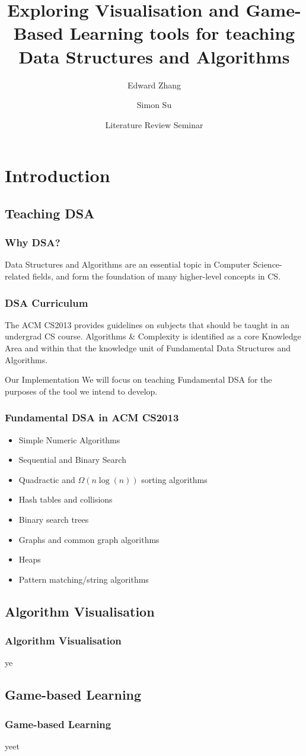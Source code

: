 \documentclass{beamer}
\title[Visualisation and GBL for DSA teaching] %
{Exploring Visualisation and Game-Based Learning tools for teaching Data Structures and Algorithms}
\author{Edward Zhang \and Simon Su}
\institute[UoA] %
{
  Department of ECSE\\
  The University of Auckland
}
\date[May 2019] %
{Literature Review Seminar}
\begin{document}
\frame{\titlepage}
\section{Introduction}
\subsection{Teaching DSA}
\begin{frame}
  \frametitle{Why DSA?}
  Data Structures and Algorithms are an essential topic in Computer Science-related fields, and form the foundation of many higher-level concepts in CS.
\end{frame}
\begin{frame}
  \frametitle{DSA Curriculum}
  The ACM CS2013 provides guidelines on subjects that should be taught in an undergrad CS course. Algorithms \& Complexity is identified as a core Knowledge Area and within that the knowledge unit of Fundamental Data Structures and Algorithms.
  \pause
  \begin{block}{Our Implementation}
  We will focus on teaching Fundamental DSA for the purposes of the tool we intend to develop.
  \end{block}
\end{frame}
\begin{frame}
  \frametitle{Fundamental DSA in ACM CS2013}
  \begin{itemize}
    \item Simple Numeric Algorithms
    \item Sequential and Binary Search
    \item Quadractic and $\Omega(n\log(n))$ sorting algorithms
    \item Hash tables and collisions
    \item Binary search trees
    \item Graphs and common graph algorithms
    \item Heaps
    \item Pattern matching/string algorithms
  \end{itemize}
\end{frame}
\subsection{Algorithm Visualisation}
\begin{frame}
  \frametitle{Algorithm Visualisation}
  ye
\end{frame}
\subsection{Game-based Learning}
\begin{frame}
  \frametitle{Game-based Learning}
  yeet
\end{frame}
\end{document}
